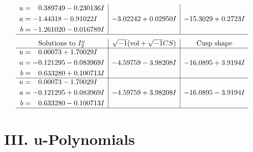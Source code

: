 \documentclass[1p]{elsarticle_modified}
\theoremstyle{definition}
\newcommand{\I}{\sqrt{-1}}
\begin{document}
$$\begin{array}{c|c|c}
\begin{aligned}
u &= \phantom{-}0.389749 - 0.230136 I \\
a &= -1.44318 - 0.91022 I \\
b &= -1.261020 - 0.016789 I\end{aligned}
 & -3.02242 + 0.02950 I & -15.3029 + 0.2723 I\\
 \hline 
 \end{array}$$\newpage$$\begin{array}{c|c|c}  
\text{Solutions to }I^u_{2}& \I (\text{vol} + \sqrt{-1}CS) & \text{Cusp shape}\\
 \hline 
\begin{aligned}
u &= \phantom{-}0.00073 + 1.70029 I \\
a &= -0.121295 - 0.083969 I \\
b &= \phantom{-}0.633280 + 0.100713 I\end{aligned}
 & -4.59759 - 3.98208 I & -16.0895 + 3.9194 I \\ \hline\begin{aligned}
u &= \phantom{-}0.00073 - 1.70029 I \\
a &= -0.121295 + 0.083969 I \\
b &= \phantom{-}0.633280 - 0.100713 I\end{aligned}
 & -4.59759 + 3.98208 I & -16.0895 - 3.9194 I\\
 \hline 
 \end{array}$$\newpage
\newpage\renewcommand{\arraystretch}{1}
\centering \section*{ III. u-Polynomials}
\end{document}
